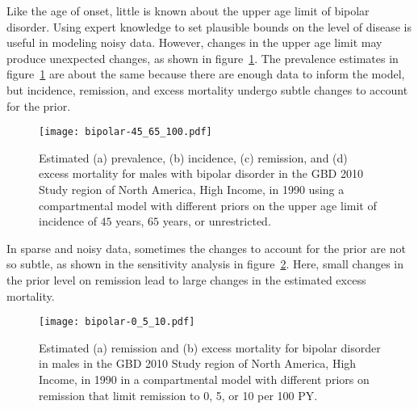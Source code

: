 Like the age of onset, little is known about the upper age limit of
bipolar disorder.  Using expert knowledge to set plausible bounds on the
level of disease is useful in modeling noisy data.  However, changes in the upper age
limit may produce unexpected changes, as shown in figure~\ref{fig:app-bipolar onset}.
The prevalence estimates in figure~\ref{fig:app-bipolar onset} are about
the same because there are enough data to inform the model, but incidence,
remission, and excess mortality undergo subtle changes to account for the prior.

    \begin{figure}[h]
        \begin{center}
            \texttt{[image: bipolar-45\_65\_100.pdf]}
            \caption[Comparison of estimates for bipolar disorder using 
              a compartmental model with different priors on the upper
              age limit of incidence.]{Estimated (a) prevalence, (b) 
              incidence, (c) remission, and
              (d) excess mortality for males with bipolar
              disorder in the GBD 2010 Study region of North America, High Income,
              in 1990 using a compartmental model with
              different priors on the upper age limit of
              incidence of $45$ years, $65$ years, or unrestricted.}
            \label{fig:app-bipolar onset}
        \end{center}
    \end{figure}

In sparse and noisy data, sometimes the changes to account for the prior
are not so subtle, as shown in the sensitivity analysis in
figure~\ref{fig:app-bipolar remission}.  Here, small changes in the
prior level on remission lead to large changes in the estimated excess mortality.

    \begin{figure}[h]
        \begin{center}
            \texttt{[image: bipolar-0\_5\_10.pdf]}
            \caption[Comparison of estimates for bipolar disorder using a 
              compartmental model with different priors on remission.]{Estimated 
              (a) remission and (b) excess
              mortality for bipolar disorder in
              males in the GBD 2010 Study region of North America, High Income,
              in 1990 in a compartmental model
              with different priors on remission that limit remission
              to 0, 5, or 10 per 100 PY.}
            \label{fig:app-bipolar remission}
        \end{center}
    \end{figure}

